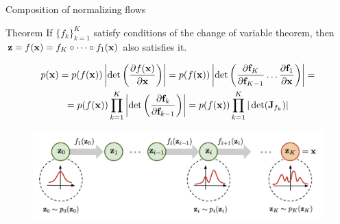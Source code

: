 \begin{frame}{Composition of normalizing flows}
	\begin{block}{Theorem}
		If $\{f_k\}_{k=1}^K$ satisfy conditions of the change of variable theorem, then $\mathbf{z} = f(\mathbf{x}) = f_K \circ \dots \circ f_1(\mathbf{x})$ also satisfies it.
	\end{block}
	\vspace{-0.5cm}
	{ \footnotesize
		\begin{multline*}
			p(\mathbf{x}) = p(f(\mathbf{x})) \left|\det \left(\frac{\partial f(\mathbf{x})}{\partial \mathbf{x}} \right) \right| =
			p(f(\mathbf{x})) \left|\det \left(\frac{\partial \textbf{f}_K}{\partial \textbf{f}_{K-1}} \dots \frac{\partial \textbf{f}_1}{\partial \mathbf{x}} \right) \right| = \\ = p(f(\mathbf{x})) \prod_{k=1}^K \left|\det \left(\frac{\partial \textbf{f}_{k}}{\partial \textbf{f}_{k-1}} \right) \right|
			= p(f(\mathbf{x})) \prod_{k=1}^K |\det ( \mathbf{J}_{f_k}) |
		\end{multline*}
	}
	\vspace{-0.3cm}
	\begin{figure}
		\includegraphics[width=0.95\linewidth]{figs/normalizing-flow}
	\end{figure}
\end{frame}

